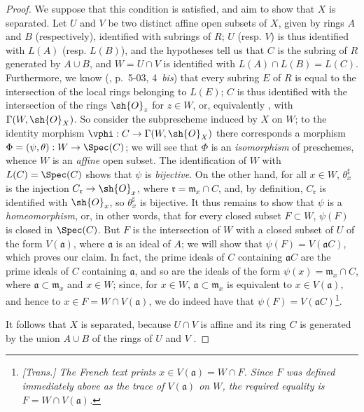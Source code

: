 \begin{proof}
We suppose that this condition is satisfied, and aim to show that $X$ is separated.
Let $U$ and $V$ be two distinct affine open subsets of $X$, given by rings $A$ and $B$ (respectively), identified with subrings of $R$;
$U$ (resp. $V$) is thus identified  with $L(A)$ (resp. $L(B)$), and the hypotheses tell us  that $C$ is the subring of $R$ generated by $A\cup B$, and $W=U\cap V$ is identified with $L(A)\cap L(B)=L(C)$.
Furthermore, we know (\cite{I-1}, p.~5-03, 4~\emph{bis}) that every subring $E$ of $R$ is equal to the intersection of the local rings belonging to $L(E)$;
$C$ is thus identified with the intersection of the rings $\sh{O}_z$ for $z\in W$, or, equivalently , with $\Gamma(W,\sh{O}_X)$.
So consider the subprescheme induced by $X$ on $W$;
to the identity morphism $\vphi: C\to\Gamma(W,\sh{O}_X)$ there corresponds  a morphism $\Phi=(\psi,\theta):W\to\Spec(C)$;
we will see that $\Phi$ is an \emph{isomorphism} of preschemes, whence $W$ is an \emph{affine} open subset.
The identification of $W$ with $L(C)=\Spec(C)$ shows that $\psi$ is \emph{bijective}.
On the other hand, for all $x\in W$, $\theta_x^\sharp$ is the injection $C_\mathfrak{r}\to\sh{O}_x$, where $\mathfrak{r}=\mathfrak{m}_x\cap C$, and, by definition, $C_\mathfrak{r}$ is identified with $\sh{O}_x$, so $\theta_x^\sharp$ is bijective.
It thus remains to show that $\psi$ is a \emph{homeomorphism}, or, in other words, that for every closed subset $F\subset W$, $\psi(F)$ is closed in
$\Spec(C)$.
But $F$ is the intersection of $W$ with a closed subset of $U$ of the form $V(\mathfrak{a})$, where $\mathfrak{a}$ is an ideal of $A$;
we will show that $\psi(F)=V(\mathfrak{a}C)$, which proves our claim.
In fact, the prime ideals of $C$ containing $\mathfrak{a}C$ are the prime ideals of $C$ containing $\mathfrak{a}$, and so are the ideals of the form $\psi(x)=\mathfrak{m}_x\cap C$, where $\mathfrak{a}\subset\mathfrak{m}_x$ and $x\in W$;
since, for $x\in W$, $\mathfrak{a}\subset\mathfrak{m}_x$ is equivalent to $x\in V(\mathfrak{a})$, and hence to $x\in F=W\cap V(\mathfrak{a})$, we do indeed have that $\psi(F)=V(\mathfrak{a}C)$\footnote{\emph{[Trans.] The French text prints $x\in V(\mathfrak a)=W\cap F$. Since $F$ was defined immediately above as the trace of $V(\mathfrak a)$ on $W$, the required equality is $F=W\cap V(\mathfrak a)$.}}.

It follows that $X$ is separated, because $U\cap V$ is affine and its ring $C$ is generated by the union $A\cup B$ of the rings of $U$ and $V$ .


\end{proof}
